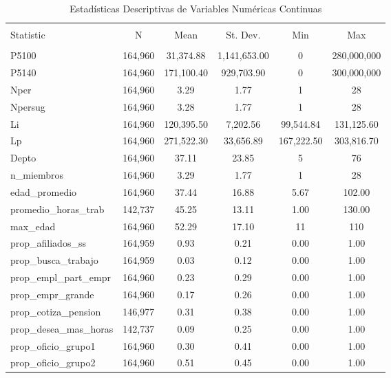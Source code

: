 
\begin{table}[!htbp] \centering 
  \caption{Estadísticas Descriptivas de Variables Numéricas Continuas} 
  \label{tab:descriptive_stats_continuous} 
\begin{tabular}{@{\extracolsep{5pt}}lccccc} 
\\[-1.8ex]\hline 
\hline \\[-1.8ex] 
Statistic & \multicolumn{1}{c}{N} & \multicolumn{1}{c}{Mean} & \multicolumn{1}{c}{St. Dev.} & \multicolumn{1}{c}{Min} & \multicolumn{1}{c}{Max} \\ 
\hline \\[-1.8ex] 
P5100 & 164,960 & 31,374.88 & 1,141,653.00 & 0 & 280,000,000 \\ 
P5140 & 164,960 & 171,100.40 & 929,703.90 & 0 & 300,000,000 \\ 
Nper & 164,960 & 3.29 & 1.77 & 1 & 28 \\ 
Npersug & 164,960 & 3.28 & 1.77 & 1 & 28 \\ 
Li & 164,960 & 120,395.50 & 7,202.56 & 99,544.84 & 131,125.60 \\ 
Lp & 164,960 & 271,522.30 & 33,656.89 & 167,222.50 & 303,816.70 \\ 
Depto & 164,960 & 37.11 & 23.85 & 5 & 76 \\ 
n\_miembros & 164,960 & 3.29 & 1.77 & 1 & 28 \\ 
edad\_promedio & 164,960 & 37.44 & 16.88 & 5.67 & 102.00 \\ 
promedio\_horas\_trab & 142,737 & 45.25 & 13.11 & 1.00 & 130.00 \\ 
max\_edad & 164,960 & 52.29 & 17.10 & 11 & 110 \\ 
prop\_afiliados\_ss & 164,959 & 0.93 & 0.21 & 0.00 & 1.00 \\ 
prop\_busca\_trabajo & 164,959 & 0.03 & 0.12 & 0.00 & 1.00 \\ 
prop\_empl\_part\_empr & 164,960 & 0.23 & 0.29 & 0.00 & 1.00 \\ 
prop\_empr\_grande & 164,960 & 0.17 & 0.26 & 0.00 & 1.00 \\ 
prop\_cotiza\_pension & 146,977 & 0.31 & 0.38 & 0.00 & 1.00 \\ 
prop\_desea\_mas\_horas & 142,737 & 0.09 & 0.25 & 0.00 & 1.00 \\ 
prop\_oficio\_grupo1 & 164,960 & 0.30 & 0.41 & 0.00 & 1.00 \\ 
prop\_oficio\_grupo2 & 164,960 & 0.51 & 0.45 & 0.00 & 1.00 \\ 

\end{tabular}
\end{table}
